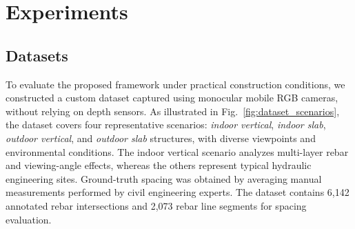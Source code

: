 \documentclass{article}
\begin{document}
\section{Experiments}
\label{sec:experiments}

\vspace{-0.3cm}

\subsection{Datasets}


To evaluate the proposed framework under practical construction conditions, we constructed a custom dataset captured using monocular mobile RGB cameras, without relying on depth sensors. As illustrated in Fig.~\ref{fig:dataset_scenarios}, the dataset covers four representative scenarios: \textit{indoor vertical}, \textit{indoor slab}, \textit{outdoor vertical}, and \textit{outdoor slab} structures, with diverse viewpoints and environmental conditions. The indoor vertical scenario analyzes multi-layer rebar and viewing-angle effects, whereas the others represent typical hydraulic engineering sites. Ground-truth spacing was obtained by averaging manual measurements performed by civil engineering experts. The dataset contains 6,142 annotated rebar intersections and 2,073 rebar line segments for spacing evaluation.
\end{document}
